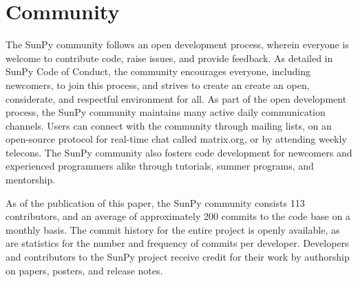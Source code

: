 \section{Community}
\label{sec:community}

The SunPy community follows an open development process, wherein everyone is welcome to contribute code, raise issues, and provide feedback.
As detailed in SunPy Code of Conduct, the community encourages everyone, including newcomers, to join this process, and strives to create an create an open, considerate, and respectful environment for all.
As part of the open development process, the SunPy community maintains many active daily communication channels.
Users can connect with the community through mailing lists, on an open-source protocol for real-time chat called matrix.org, or by attending weekly telecons.
The SunPy community also fosters code development for newcomers and experienced programmers alike through tutorials, summer programs, and mentorship.

As of the publication of this paper, the SunPy community consists 113 contributors, and an average of approximately 200 commits to the code base on a monthly basis.
The commit history for the entire project is openly available, as are statistics for the number and frequency of commits per developer.
Developers and contributors to the SunPy project receive credit for their work by authorship on papers, posters, and release notes.
